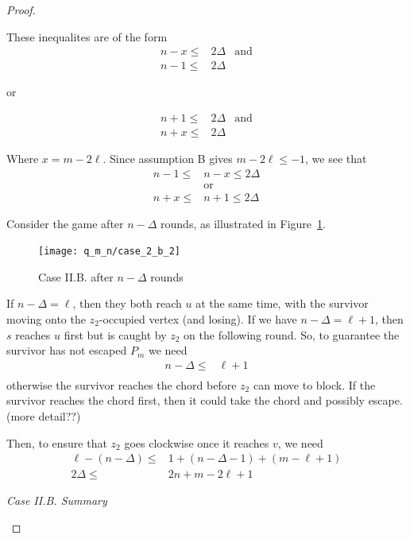 \begin{proof}
\begin{proofpart}
  These inequalites are of the form
  \begin{align*}
   n-x \leq & 2 \Delta & \text{and} \\
   n-1 \leq & 2\Delta
  \end{align*}
  \begin{center}or\end{center}
  \begin{align*}
   n + 1 \leq & 2 \Delta & \text{and} \\
   n + x \leq & 2 \Delta
  \end{align*}

  Where $x = m -2\ell$. Since assumption B gives $m - 2\ell \leq -1$, we
  see that
  \begin{align*}
   n-1 \leq & n-x \leq 2 \Delta \\
            & \text{or}         \\
   n+x \leq & n+1 \leq 2 \Delta
  \end{align*}

  Consider the game after $n-\Delta$ rounds, as illustrated in Figure~\ref{fig:case_2_b_2}.

  \begin{figure}
    \centering
    \texttt{[image: q\_m\_n/case\_2\_b\_2]}
    \caption{Case II.B. after $n-\Delta$ rounds \label{fig:case_2_b_2}}
  \end{figure}

  If $n - \Delta = \ell$, then they both reach $u$ at the same time,
  with the survivor moving onto the $z_2$-occupied vertex (and losing).
  If we have $n - \Delta = \ell + 1$, then $s$ reaches $u$ first
  but is caught by $z_2$ on the following round.
  So, to guarantee the survivor has not escaped $P_m$ we need
  \begin{align*}
   n - \Delta \leq & \ell + 1 \\
  \end{align*}
  otherwise the survivor reaches the chord before $z_2$ can move
  to block. If the survivor reaches the chord first, then it could
  take the chord and possibly escape. (more detail??)

  Then, to ensure that $z_2$ goes clockwise once it reaches $v$, we need
  \begin{align*}
   \ell - (n - \Delta) \leq & 1 + (n - \Delta - 1) + (m - \ell + 1) \\
   2 \Delta \leq            & 2n + m - 2\ell + 1
  \end{align*}

  \textit{Case II.B. Summary}


\end{proofpart}
\end{proof}
